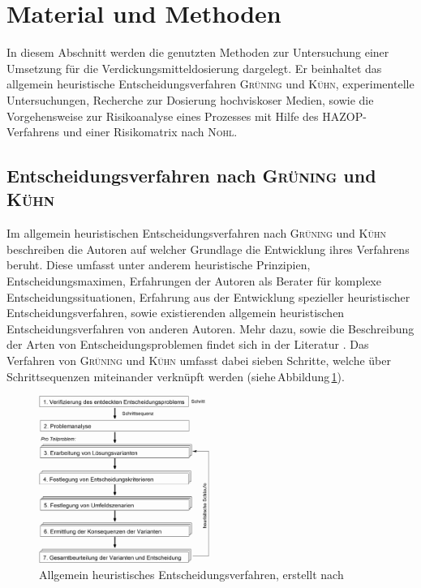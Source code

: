 \newpage
\section{Material und Methoden}
\label{sec:durchführung}

In diesem Abschnitt werden die genutzten Methoden zur Untersuchung einer Umsetzung für die Verdickungsmitteldosierung dargelegt. Er beinhaltet das allgemein heuristische Entscheidungsverfahren \textsc{Grüning} und \textsc{Kühn}, experimentelle Untersuchungen, Recherche zur Dosierung hochviskoser Medien, sowie die Vorgehensweise zur Risikoanalyse eines Prozesses mit Hilfe des HAZOP-Verfahrens und einer Risikomatrix nach \textsc{Nohl}.

\subsection{Entscheidungsverfahren nach \textsc{Grüning} und \textsc{Kühn}}

Im allgemein heuristischen Entscheidungsverfahren nach \textsc{Grüning} und \textsc{Kühn} beschreiben die Autoren auf welcher Grundlage die Entwicklung ihres Verfahrens beruht. Diese umfasst unter anderem heuristische Prinzipien, Entscheidungsmaximen, Erfahrungen der Autoren als Berater für komplexe Entscheidungssituationen, Erfahrung aus der Entwicklung spezieller heuristischer Entscheidungsverfahren, sowie existierenden allgemein heuristischen Entscheidungsverfahren von anderen Autoren. Mehr dazu, sowie die Beschreibung der Arten von Entscheidungsproblemen findet sich in der Literatur \cite{Grunig.2013}. Das Verfahren von \textsc{Grüning} und \textsc{Kühn} umfasst dabei sieben Schritte, welche über Schrittsequenzen miteinander verknüpft werden (siehe\,Abbildung\,\ref{fig:ahev}).  

\begin{figure}[h!]
	\centering
	\includegraphics[width=0.5\textwidth]{img/heuristik}
	\caption{Allgemein heuristisches Entscheidungsverfahren, erstellt nach \cite{Grunig.2013}}
	\label{fig:ahev}
\end{figure}
\FloatBarrier

